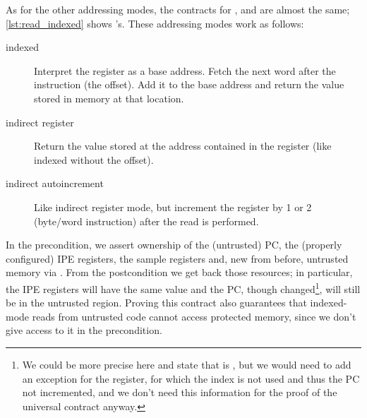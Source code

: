 As for the other addressing modes, the contracts for ,  and  are almost the same; \cref{lst:read_indexed} shows 's. These addressing modes work as follows:
\begin{description}
\item[indexed] Interpret the register as a base address. Fetch the next word after the instruction (the offset). Add it to the base address and return the value stored in memory at that location.
\item[indirect register] Return the value stored at the address contained in the register (like indexed without the offset).
\item[indirect autoincrement] Like indirect register mode, but increment the register by 1 or 2 (byte/word instruction) after the read is performed.
\end{description}

In the precondition, we assert ownership of the (untrusted) PC, the (properly configured) IPE registers, the sample registers and, new from before, untrusted memory via . From the postcondition we get back those resources; in particular, the IPE registers will have the same value and the PC, though changed\footnote{We could be more precise here and state that  is , but we would need to add an exception for the  register, for which the index is not used and thus the PC not incremented, and we don't need this information for the proof of the universal contract anyway.}, will still be in the untrusted region. Proving this contract also guarantees that indexed-mode reads from untrusted code cannot access protected memory, since we don't give access to it in the precondition.

